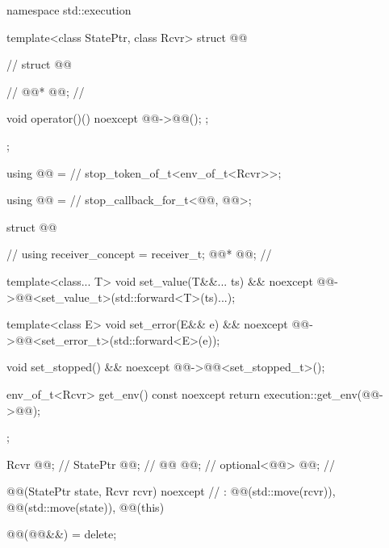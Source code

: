 \begin{codeblock}
namespace std::execution {
  template<class StatePtr, class Rcvr>
  struct @@ {                                     // \expos
    struct @@ {                                           // \expos
      @@* @@;                                    // \expos

      void operator()() noexcept {
        @@->@@();
      };
    };

    using @@ =                                        // \expos
      stop_token_of_t<env_of_t<Rcvr>>;

    using @@ =                                     // \expos
      stop_callback_for_t<@@, @@>;

    struct @@ {                                             // \expos
      using receiver_concept = receiver_t;
      @@* @@;                                     // \expos

      template<class... T>
      void set_value(T&&... ts) && noexcept {
        @@->@@<set_value_t>(std::forward<T>(ts)...);
      }

      template<class E>
      void set_error(E&& e) && noexcept {
        @@->@@<set_error_t>(std::forward<E>(e));
      }

      void set_stopped() && noexcept {
        @@->@@<set_stopped_t>();
      }

      env_of_t<Rcvr> get_env() const noexcept {
        return execution::get_env(@@->@@);
      }
    };

    Rcvr @@;                                                  // \expos
    StatePtr @@;                                             // \expos
    @@ @@;                                               // \expos
    optional<@@> @@;                     // \expos


    @@(StatePtr state, Rcvr rcvr) noexcept        // \expos
      : @@(std::move(rcvr)), @@(std::move(state)), @@(this)
    {}

    @@(@@&&) = delete;

}}
\end{codeblock}
